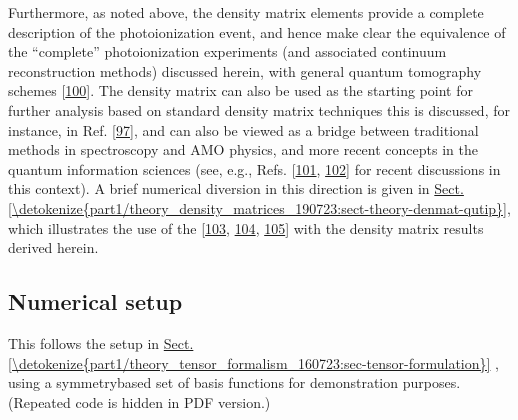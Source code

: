 \documentclass[letterpaper,table,10pt,english]{jupyterBook}
\begin{document}
\sphinxAtStartPar
Furthermore, as noted above, the density matrix elements provide a complete description of the photoionization event, and hence make clear the equivalence of the “complete” photoionization experiments (and associated continuum reconstruction methods) discussed herein, with general quantum tomography schemes {[}\hyperlink{cite.backmatter/bibliography:id781}{100}{]}. The density matrix can also be used as the starting point for further analysis based on standard density matrix techniques \sphinxhyphen{} this is discussed, for instance, in Ref. {[}\hyperlink{cite.backmatter/bibliography:id534}{97}{]}, and can also be viewed as a bridge between traditional methods in spectroscopy and AMO physics, and more recent concepts in the quantum information sciences (see, e.g., Refs. {[}\hyperlink{cite.backmatter/bibliography:id920}{101}, \hyperlink{cite.backmatter/bibliography:id984}{102}{]} for recent discussions in this context). A brief numerical diversion in this direction is given in \hyperref[\detokenize{part1/theory_density_matrices_190723:sect-theory-denmat-qutip}]{Sect.\@ \ref{\detokenize{part1/theory_density_matrices_190723:sect-theory-denmat-qutip}}}, which illustrates the use of the  {[}\hyperlink{cite.backmatter/bibliography:id705}{103}, \hyperlink{cite.backmatter/bibliography:id706}{104}, \hyperlink{cite.backmatter/bibliography:id831}{105}{]} with the density matrix results derived herein.


\subsection{Numerical setup}
\label{\detokenize{part1/theory_density_matrices_190723:numerical-setup}}
\sphinxAtStartPar
This follows the setup in \hyperref[\detokenize{part1/theory_tensor_formalism_160723:sec-tensor-formulation}]{Sect.\@ \ref{\detokenize{part1/theory_tensor_formalism_160723:sec-tensor-formulation}}} {\hyperref[\detokenize{part1/theory_tensor_formalism_160723:sec-tensor-formulation}]{}}, using a symmetry\sphinxhyphen{}based set of basis functions for demonstration purposes. (Repeated code is hidden in PDF version.)
\end{document}

